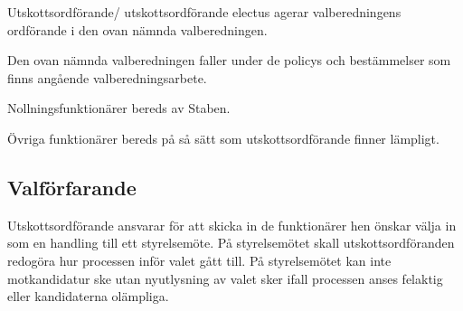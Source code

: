 \documentclass{dsekprotokoll}
\begin{document}
Utskottsordförande/ utskottsordförande electus agerar valberedningens ordförande i den ovan nämnda valberedningen.

Den ovan nämnda valberedningen faller under de policys och bestämmelser som finns angående valberedningsarbete.

Nollningsfunktionärer bereds av Staben.

Övriga funktionärer bereds på så sätt som utskottsordförande finner lämpligt.

\subsection{Valförfarande}
Utskottsordförande ansvarar för att skicka in de funktionärer hen önskar välja in som en handling till ett styrelsemöte. På styrelsemötet skall utskottsordföranden redogöra hur processen inför valet gått till. På styrelsemötet kan inte motkandidatur ske utan nyutlysning av valet sker ifall processen anses felaktig eller kandidaterna olämpliga.

\pagebreak
\end{document}
